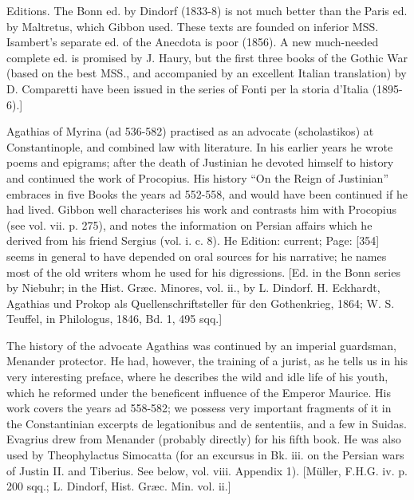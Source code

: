 Editions. The Bonn ed. by Dindorf (1833-8) is not much better than the Paris ed. by Maltretus, which Gibbon used. These texts are founded on inferior MSS. Isambert\texthebrew{}’s separate ed. of the Anecdota is poor (1856). A new much-needed complete ed. is promised by J. Haury, but the first three books of the Gothic War (based on the best MSS., and accompanied by an excellent Italian translation) by D. Comparetti have been issued in the series of Fonti per la storia d\texthebrew{}’Italia (1895-6).]

Agathias of Myrina (ad 536-582) practised as an advocate (scholastikos) at Constantinople, and combined law with literature. In his earlier years he wrote poems and epigrams; after the death of Justinian he devoted himself to history and continued the work of Procopius. His history \texthebrew{“}On the Reign of Justinian\texthebrew{}” embraces in five Books the years ad 552-558, and would have been continued if he had lived. Gibbon well characterises his work and contrasts him with Procopius (see vol. vii. p. 275), and notes the information on Persian affairs which he derived from his friend Sergius (vol. i. c. 8). He Edition: current; Page: [354] seems in general to have depended on oral sources for his narrative; he names most of the old writers whom he used for his digressions. [Ed. in the Bonn series by Niebuhr; in the Hist. Græc. Minores, vol. ii., by L. Dindorf. H. Eckhardt, Agathias und Prokop als Quellenschriftsteller für den Gothenkrieg, 1864; W. S. Teuffel, in Philologus, 1846, Bd. 1, 495 sqq.]

The history of the advocate Agathias was continued by an imperial guardsman, Menander protector. He had, however, the training of a jurist, as he tells us in his very interesting preface, where he describes the wild and idle life of his youth, which he reformed under the beneficent influence of the Emperor Maurice. His work covers the years ad 558-582; we possess very important fragments of it in the Constantinian excerpts de legationibus and de sententiis, and a few in Suidas. Evagrius drew from Menander (probably directly) for his fifth book. He was also used by Theophylactus Simocatta (for an excursus in Bk. iii. on the Persian wars of Justin II. and Tiberius. See below, vol. viii. Appendix 1). [Müller, F.H.G. iv. p. 200 sqq.; L. Dindorf, Hist. Græc. Min. vol. ii.]

